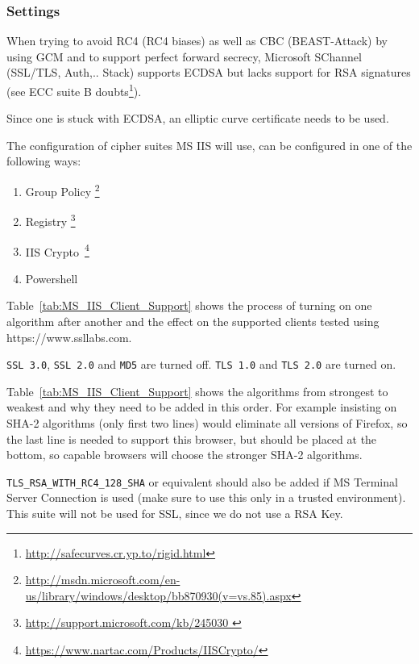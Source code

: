 \subsubsection{Settings}
When trying to avoid RC4 (RC4 biases) as well as CBC (BEAST-Attack) by using GCM and to support perfect
forward secrecy, Microsoft SChannel (SSL/TLS, Auth,.. Stack) supports
ECDSA but lacks support for RSA signatures (see ECC suite
B doubts\footnote{\url{http://safecurves.cr.yp.to/rigid.html}}).

Since one is stuck with ECDSA, an elliptic curve certificate needs to be used.

The configuration of cipher suites MS IIS will use, can be configured in one
of the following ways:
\begin{enumerate}
  \item Group Policy \footnote{\url{http://msdn.microsoft.com/en-us/library/windows/desktop/bb870930(v=vs.85).aspx}}
  \item Registry  \footnote{\url{http://support.microsoft.com/kb/245030 }}
  \item IIS Crypto~\footnote{\url{https://www.nartac.com/Products/IISCrypto/}}
  \item Powershell 
\end{enumerate}


Table~\ref{tab:MS_IIS_Client_Support} shows the process of turning on
one algorithm after another and the effect on the supported clients
tested using https://www.ssllabs.com.

\verb|SSL 3.0|, \verb|SSL 2.0| and \verb|MD5| are turned off.
\verb|TLS 1.0| and \verb|TLS 2.0| are turned on.


Table~\ref{tab:MS_IIS_Client_Support} shows the algorithms from
strongest to weakest and why they need to be added in this order. For
example insisting on SHA-2 algorithms (only first two lines) would
eliminate all versions of Firefox, so the last line is needed to
support this browser, but should be placed at the bottom, so capable
browsers will choose the stronger SHA-2 algorithms.

\verb|TLS_RSA_WITH_RC4_128_SHA| or equivalent should also be added if
MS Terminal Server Connection is used (make sure to use this only in a
trusted environment). This suite will not be used for SSL, since we do
not use a RSA Key.

